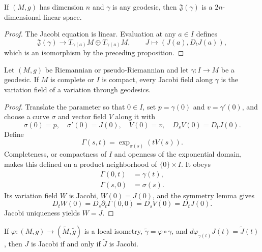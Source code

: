\begin{corollary}
\label{cor:jacobi-space-dimension}
If $(M,g)$ has dimension $n$ and $\gamma$ is any geodesic, then
$\mathfrak J(\gamma)$ is a $2n$-dimensional linear space.
\end{corollary}

\begin{proof}
\sketch
The Jacobi equation is linear.  Evaluation at any $a\in I$ defines
\[
\mathfrak J(\gamma)\longrightarrow T_{\gamma(a)}M\oplus T_{\gamma(a)}M,
\qquad
J\longmapsto(J(a),D_tJ(a)),
\]
which is an isomorphism by the preceding proposition.
\end{proof}

\begin{proposition}
\label{prop:jacobi-field-variation-field}
Let $(M,g)$ be Riemannian or pseudo-Riemannian and let $\gamma:I\to M$ be a
geodesic.  If $M$ is complete or $I$ is compact, every Jacobi field along
$\gamma$ is the variation field of a variation through geodesics.
\end{proposition}

\begin{proof}
\sketch
Translate the parameter so that $0\in I$, set $p=\gamma(0)$ and
$v=\gamma'(0)$, and choose a curve $\sigma$ and vector field $V$ along it with
\[
\sigma(0)=p,\quad \sigma'(0)=J(0),\quad
V(0)=v,\quad D_sV(0)=D_tJ(0).
\]
Define
\begin{equation}
\Gamma(s,t)=\exp_{\sigma(s)}(tV(s)). \tag{10.2}
\end{equation}
Completeness, or compactness of $I$ and openness of the exponential domain,
makes this defined on a product neighborhood of $\{0\}\times I$.  It obeys
\begin{align}
\Gamma(0,t)&=\gamma(t), \tag{10.3}\\
\Gamma(s,0)&=\sigma(s). \tag{10.4}
\end{align}
Its variation field $W$ is Jacobi, $W(0)=J(0)$, and the symmetry lemma gives
\[
D_tW(0)=D_s\partial_t\Gamma(0,0)=D_sV(0)=D_tJ(0).
\]
Jacobi uniqueness yields $W=J$.
\end{proof}

\begin{proposition}
\label{prop:local-isometry-invariance-jacobi-fields}
If $\varphi:(M,g)\to(\widetilde M,\widetilde g)$ is a local isometry,
$\widetilde\gamma=\varphi\circ\gamma$, and
$d\varphi_{\gamma(t)}J(t)=\widetilde J(t)$, then $J$ is Jacobi if and only if
$\widetilde J$ is Jacobi.
\end{proposition}


